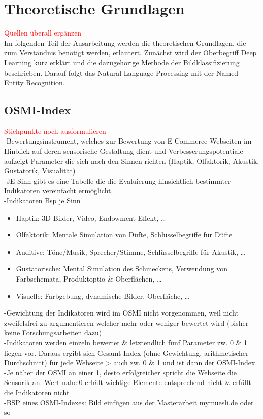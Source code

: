\newpage
\section{Theoretische Grundlagen}
\textcolor{red}{Quellen überall ergänzen} \\
Im folgenden Teil der Ausarbeitung werden die theoretischen Grundlagen, die zum Verständnis benötigt werden, erläutert.
Zunächst wird der Oberbegriff Deep Learning kurz erklärt und die dazugehörige Methode der Bildklassifizierung beschrieben. Darauf folgt das Natural Language Processing mit der Named Entity Recognition.

\subsection{OSMI-Index}

\textcolor{red}{Stichpunkte noch ausformulieren} \\

-Bewertungsinstrument, welches zur Bewertung von E-Commerce Webseiten im Hinblick auf
deren sensorische Gestaltung dient und Verbesserungspotentiale aufzeigt
Parameter die sich nach den Sinnen richten (Haptik, Olfaktorik, Akustik, Gustatorik,
Visualität) \\
-JE Sinn gibt es eine Tabelle die die Evaluierung hinsichtlich bestimmter Indikatoren
vereinfacht ermöglicht. \\
-Indikatoren Bsp je Sinn\\
\begin{itemize}
    \item Haptik: 3D-Bilder, Video, Endowment-Effekt, …
    \item Olfaktorik: Mentale Simulation von Düfte, Schlüsselbegriffe für Düfte
    \item Auditive: Töne/Musik, Sprecher/Stimme, Schlüsselbegriffe für Akustik, …
    \item Gustatorische: Mental Simulation des Schmeckens, Verwendung von
    Farbschemata, Produktoptio \& Oberflächen, …
    \item Visuelle: Farbgebung, dynamische Bilder, Oberfläche, …
\end{itemize}

-Gewichtung der Indikatoren wird im OSMI nicht vorgenommen, weil nicht zweifelsfrei zu
argumentieren welcher mehr oder weniger bewertet wird (bisher keine Forschungsarbeiten
dazu) \\
-Indikatoren werden einzeln bewertet \& letztendlich fünf Parameter zw. 0 \& 1 liegen vor.
Daraus ergibt sich Gesamt-Index (ohne Gewichtung, arithmetischer Durchschnitt) für jede
Webseite > auch zw. 0 \& 1 und ist dann der OSMI-Index \\
-Je näher der OSMI an einer 1, desto erfolgreicher spricht die Webseite die Sensorik an. Wert
nahe 0 erhält wichtige Elemente entsprechend nicht \& erfüllt die Indikatoren nicht \\
-BSP eines OSMI-Indexes: Bild einfügen aus der Masterarbeit mymuesli.de oder so



